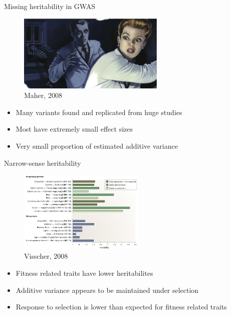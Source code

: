 \documentclass{beamer}
\begin{document}
\begin{frame}{Missing heritability in GWAS}
\begin{center}
\begin{figure}
\includegraphics[width=7cm]{missing.jpg} \\
{\tiny Maher, 2008}
\end{figure}
\end{center}
\begin{itemize}
\item Many variants found and replicated from huge studies
\item Most have extremely small effect sizes
\item Very small proportion of estimated additive variance
\end{itemize}
\end{frame}

\begin{frame}{Narrow-sense heritability}
\begin{figure}
\includegraphics[width=6cm]{visscher2008_heritabiliy.jpg} \\
{\tiny Visscher, 2008}
\end{figure}
\begin{itemize}
\item Fitness related traits have lower heritabilites
\item Additive variance appears to be maintained under selection
\item Response to selection is lower than expected for fitness related traits
\end{itemize}
\end{frame}
\end{document}
